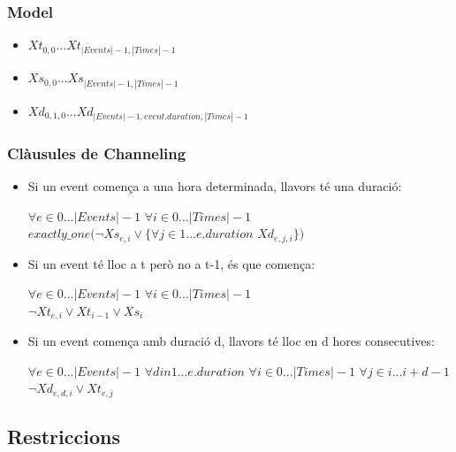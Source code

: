 \documentclass[8pt]{beamer}
\begin{document}
  \begin{frame}
    \frametitle{Model}

    \begin{itemize}
      \item $Xt_{0,0} . . . Xt_{|Events|-1,|Times|-1}$
      \item $Xs_{0,0} . . . Xs_{|Events|-1,|Times|-1}$
      \item $Xd_{0,1,0} . . . Xd_{|Events|-1, event.duration, |Times|-1}$
    \end{itemize}
  \end{frame}

  \begin{frame}
  \frametitle{Clàusules de Channeling}  

  \begin{itemize}
    \item Si un event comença a una hora determinada, llavors té una duració: \begin{center} $\forall e \in 0 ... |Events|-1$ $\forall i \in 0 ... |Times|-1$ \\$exactly\_one(\neg Xs_{e,i} \vee \{ \forall j \in 1 ... e.duration$ $Xd_{e,j,i}\})$\end{center}
    \item Si un event té lloc a t però no a t-1, és que comença: \begin{center} $\forall e \in 0 ... |Events|-1$ $\forall i \in 0 ... |Times|-1$ \\$\neg Xt_{e,i} \vee Xt_{i-1} \vee Xs_i$ \end{center}
    \item Si un event comença amb duració d, llavors té lloc en d hores consecutives: \begin{center} 
      $\forall e \in 0 ... |Events|-1$ $\forall d in 1 ... e.duration$ $\forall i \in 0 ... |Times|-1$ $\forall j \in i ... i+d-1$ \\
      $\neg Xd_{e,d,i} \vee Xt_{e,j}$    
    \end{center}
  \end{itemize}

  \end{frame}

  \subsection{Restriccions}
\end{document}
